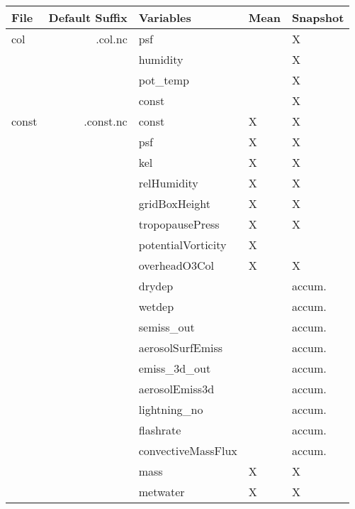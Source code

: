 \begin{center}
\begin{longtable}{|l|r|l|l|l|} \hline\hline
{\bf File} & {\bf Default Suffix} & {\bf Variables} & {\bf Mean} & {\bf Snapshot} \\ \hline\hline
%
col   &   .col.nc   & psf               &      &    X      \\
      &             & humidity          &      &    X      \\
      &             & pot\_temp         &      &    X      \\ 
      &             & const             &      &    X      \\ \hline
%
const &   .const.nc & const             & X    &    X      \\
      &             &  psf              & X    &    X       \\
      &             &  kel              & X    &    X      \\
      &             &  relHumidity      & X    &    X      \\
      &             &  gridBoxHeight    & X    &    X      \\
      &             & tropopausePress   & X    &    X      \\
      &             & potentialVorticity& X    &        \\ 
      &             &  overheadO3Col    & X    &    X      \\
      &             &  drydep           &      &  accum.   \\
      &             &  wetdep           &      &  accum.   \\
      &             &  semiss\_out      &      &  accum.   \\
      &             & aerosolSurfEmiss  &      &  accum.   \\
      &             &  emiss\_3d\_out   &      &  accum.   \\
      &             &  aerosolEmiss3d   &      &  accum.   \\
      &             &  lightning\_no    &      &  accum.   \\
      &             &  flashrate        &      &  accum.   \\
      &             &convectiveMassFlux &      &  accum.   \\
      &             &  mass             & X    &    X      \\
      &             &  metwater         & X    &    X      \\

\end{longtable}
\end{center}
